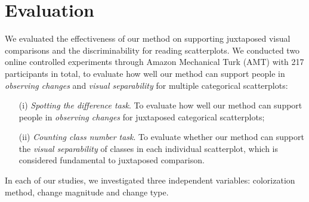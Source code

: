 \section {Evaluation}
\label{sec:results}

We evaluated the effectiveness of our method on supporting juxtaposed visual comparisons and the discriminability for reading scatterplots. %
We conducted two online controlled experiments through Amazon Mechanical Turk (AMT) with 217 participants in total, to evaluate how well our method can support people in \emph{observing changes} and \emph{visual separability} for multiple categorical scatterplots:
\begin{enumerate}
\item [(i)] \emph{Spotting the difference task}. To evaluate how well our method can support people in \emph{observing changes} for juxtaposed categorical scatterplots;
\item [(ii)] \emph{Counting class number task}. To evaluate whether our method can support the \emph{visual separability} of classes in each individual scatterplot, which is considered fundamental to juxtaposed comparison.
\end{enumerate}

\vspace{.3em}
 In each of our studies, we investigated three independent variables: colorization method, change magnitude and change type.

